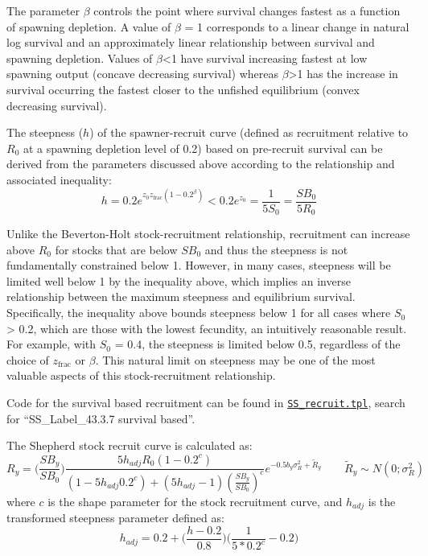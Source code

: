 The parameter $\beta$ controls the point where survival changes fastest as a function of spawning depletion. A value of $\beta$ = 1 corresponds to a linear change in natural log survival and an approximately linear relationship between survival and spawning depletion. Values of $\beta$<1 have survival increasing fastest at low spawning output (concave decreasing survival) whereas $\beta$>1 has the increase in survival occurring the fastest closer to the unfished equilibrium (convex decreasing survival).

The steepness ($h$) of the spawner-recruit curve (defined as recruitment relative to $R_{0}$ at a spawning depletion level of 0.2) based on pre-recruit survival can be derived from the parameters discussed above according to the relationship and associated inequality:
\begin{equation}
h = 0.2e^{z_0z_{\text{frac}}(1-0.2^\beta)}<0.2e^{z_0}=\frac{1}{5S_0}=\frac{SB_0}{5R_0}
\end{equation}

Unlike the Beverton-Holt stock-recruitment relationship, recruitment can increase above $R_0$ for stocks that are below $SB_0$ and thus the steepness is not fundamentally constrained below 1. However, in many cases, steepness will be limited well below 1 by the inequality above, which implies an inverse relationship between the maximum steepness and equilibrium survival. Specifically, the inequality above bounds steepness below 1 for all cases where $S_0$ > 0.2, which are those with the lowest fecundity, an intuitively reasonable result. For example, with $S_0$ = 0.4, the steepness is limited below 0.5, regardless of the choice of $z_{\text{frac}}$ or $\beta$. This natural limit on steepness may be one of the most valuable aspects of this stock-recruitment relationship.

Code for the survival based recruitment can be found in \href{https://github.com/nmfs-ost/ss3-source-code/blob/main/SS_recruit.tpl}{\texttt{SS\_recruit.tpl}}, search for ``SS\_Label\_43.3.7 survival based''.

\hypertarget{Shepherd}{} 
The Shepherd stock recruit curve is calculated as:
\begin{equation}
R_y = \bigg(\frac{SB_y}{SB_0}\bigg)\frac{5h_{adj}R_0(1-0.2^c)}{(1-5h_{adj}0.2^c)+(5h_{adj}-1)(\frac{SB_y}{SB_0})^c}e^{-0.5b_y\sigma^2_R+\tilde{R}_y}\qquad \tilde{R}_y\sim N(0;\sigma^2_R)
\end{equation}
where $c$ is the shape parameter for the stock recruitment curve, and $h_{adj}$ is the transformed steepness parameter defined as:
\begin{equation}
h_{adj}=0.2+\bigg(\frac{h-0.2}{0.8}\bigg)\bigg(\frac{1}{5*0.2^c}-0.2\bigg)
\end{equation}

